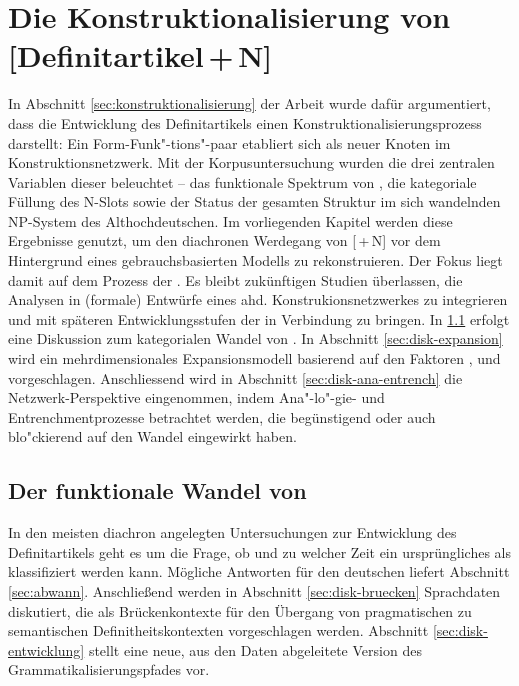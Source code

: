 \chapter{Die Konstruktionalisierung von [Definitartikel\,+\,N]} \label{bicpic}

In Abschnitt \ref{sec:konstruktionalisierung} der Arbeit wurde dafür argumentiert, dass die Entwicklung des Definitartikels  einen Konstruktionalisierungsprozess  darstellt: Ein Form-Funk"-tions"-paar etabliert sich als neuer Knoten im Konstruktionsnetzwerk. Mit der Korpusuntersuchung   wurden die drei zentralen Variablen dieser  beleuchtet -- das funktionale Spektrum von , die kategoriale Füllung des N-Slots sowie der Status der gesamten Struktur im sich wandelnden NP-System   des Althochdeutschen. Im vorliegenden Kapitel werden diese Ergebnisse genutzt, um den diachronen Werdegang von [\,+\,N] vor dem Hintergrund eines gebrauchsbasierten Modells zu rekonstruieren. 
Der Fokus liegt damit auf dem Prozess der . Es bleibt zukünftigen Studien überlassen, die Analysen in (formale) Entwürfe eines ahd. Konstrukionsnetzwerkes zu integrieren und  mit späteren Entwicklungsstufen der  in Verbindung zu bringen. 
In \ref{diskussion:der} erfolgt eine Diskussion zum kategorialen Wandel von .  In Abschnitt \ref{sec:disk-expansion} wird ein mehrdimensionales Expansionsmodell  basierend auf den Faktoren ,   und  vorgeschlagen. Anschlies\-send wird in Abschnitt \ref{sec:disk-ana-entrench} die Netzwerk-Perspektive eingenommen, indem Ana"-lo"-gie- und  Entrenchmentprozesse  betrachtet werden, die begünstigend oder auch blo"ckierend auf den Wandel eingewirkt haben. 

\section{Der funktionale Wandel von } \label{diskussion:der}

In den meisten diachron angelegten Untersuchungen zur Entwicklung des Definitartikels  geht es um die Frage, ob und zu welcher Zeit ein ursprüngliches  als  klassifiziert werden kann. Mögliche Antworten für den deutschen  liefert Abschnitt \ref{sec:abwann}. Anschließend werden in Abschnitt \ref{sec:disk-bruecken} Sprachdaten diskutiert, die  als Brückenkontexte  für den Übergang von pragmatischen  zu semantischen  Definitheitskontexten  vorgeschlagen werden. Abschnitt \ref{sec:disk-entwicklung} stellt eine neue, aus den Daten abgeleitete Version des Grammatikalisierungspfades  vor. 


